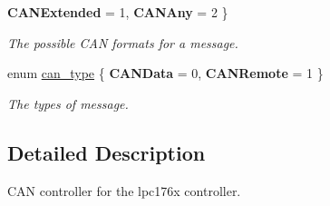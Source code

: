 \begin{DoxyCompactItemize}
{\bfseries C\+A\+N\+Extended} = 1, 
{\bfseries C\+A\+N\+Any} = 2
 \}
\begin{DoxyCompactList}\small\item\em The possible C\+AN formats for a message. \end{DoxyCompactList}\item 
\mbox{\label{can-defs_8h_a6e8e36d0c79c9a660f2c3c20255f28a2}} 
enum \mbox{\hyperlink{can-defs_8h_a6e8e36d0c79c9a660f2c3c20255f28a2}{can\+\_\+type}} \{ {\bfseries C\+A\+N\+Data} = 0, 
{\bfseries C\+A\+N\+Remote} = 1
 \}
\begin{DoxyCompactList}\small\item\em The types of message. \end{DoxyCompactList}\end{DoxyCompactItemize}


\subsection{Detailed Description}
C\+AN controller for the lpc176x controller. 

